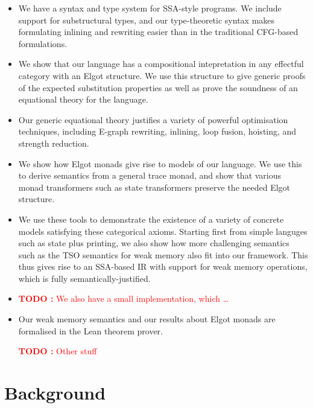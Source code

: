 \documentclass[acmsmall,screen,review]{acmart}
\newcounter{todos}
\newcommand{\TODO}[1]{{
  \stepcounter{todos}
  \begin{center}\large{\textcolor{red}{\textbf{TODO \arabic{todos}:} #1}}\end{center}
}}
\begin{document}
\begin{itemize}
\item We have a syntax and type system for SSA-style programs. We include support for substructural types, and our type-theoretic syntax makes formulating inlining and rewriting easier than in the traditional CFG-based formulations. 
\item We show that our language has a compositional intepretation in any effectful category with an Elgot structure. We use this structure to give generic proofs of the expected substitution properties as well as prove the soundness of an equational theory for the language.
\item Our generic equational theory justifies a variety of powerful optimisation techniques, including E-graph rewriting, inlining, loop fusion, hoisting, and strength reduction. 
\item We show how Elgot monads give rise to models of our language. We use this to derive semantics from a general trace monad, and show that various monad transformers such as state transformers preserve the needed Elgot structure. 
\item We use these tools to demonstrate the existence of a variety of concrete models satisfying these categorical axioms. Starting first from simple languges such as state plus printing, we also show how more challenging semantics such as the TSO semantics for weak memory also fit into our framework. This thus gives rise to an SSA-based IR with support for weak memory operations, which is fully semantically-justified.
\item \TODO{We also have a small implementation, which \ldots}
\item Our weak memory semantics and our results about Elgot monads are formalised in the Lean theorem prover. \TODO{Other stuff}
\end{itemize}

\section{Background}
\end{document}
